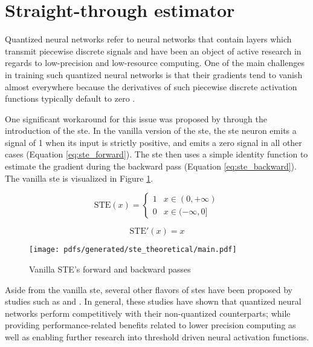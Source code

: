 \section{Straight-through estimator}

\label{section:ste}

Quantized neural networks refer to neural networks that contain
layers which transmit piecewise discrete signals and have been an object of
active research in regards to low-precision and low-resource computing. One of
the main challenges in training such quantized neural networks is
that their gradients tend to vanish almost everywhere because the derivatives of
such piecewise discrete activation functions typically default to zero
\citep{bengio2013estimating,courbariaux2016binarized,yin2019understanding}.

One significant workaround for this issue was proposed by
\citet{bengio2013estimating} through the introduction of the \ac{ste}. In the
vanilla version of the \ac{ste}, the \ac{ste} neuron emits a signal of 1 when its input is
strictly positive, and emits a zero signal in all other cases (Equation
\ref{eq:ste_forward}). The \ac{ste} then uses a simple identity function to estimate
the gradient during the backward pass (Equation \ref{eq:ste_backward}). The
vanilla \ac{ste} is visualized in Figure \ref{fig:ste}.

\begin{equation}
  \label{eq:ste_forward}
  \text{STE}(x)=
  \begin{cases}
    1 & x \in (0, +\infty) \\
    0 & x \in (-\infty, 0]
  \end{cases}
\end{equation}

\begin{equation}
  \label{eq:ste_backward}
  \text{STE}'(x)= x
\end{equation}

\begin{figure}[t]
  \centering
  \texttt{[image: pdfs/generated/ste\_theoretical/main.pdf]}
  \caption{Vanilla STE's forward and backward passes}
  \label{fig:ste}
\end{figure}

Aside from the vanilla \ac{ste}, several other flavors of \ac{ste}s have been proposed by
studies such as \citet{courbariaux2016binarized} and
\citet{yin2019understanding}. In general, these studies have shown that
quantized neural networks perform competitively with their
non-quantized counterparts; while providing performance-related benefits related
to lower precision computing as well as enabling further research into threshold
driven neural activation functions.

